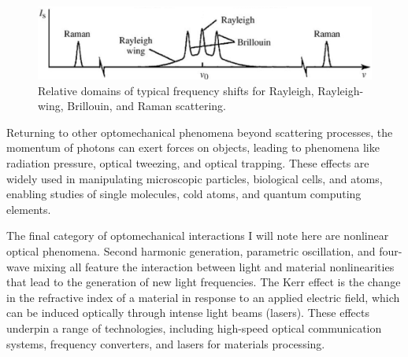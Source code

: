 
\begin{figure}[t] %
\centering
\includegraphics[width=0.75\linewidth]{figs/1-Intro/Boyd scattering frequency shift domains.png}
\caption{Relative domains of typical frequency shifts for Rayleigh, Rayleigh-wing, Brillouin, and Raman scattering.}
\label{fig:scattering-freq-shift-domains}
\end{figure}

Returning to other optomechanical phenomena beyond scattering processes, the momentum of photons can exert forces on objects, leading to phenomena like radiation pressure, optical tweezing, and optical trapping. These effects are widely used in manipulating microscopic particles\cite{}, biological cells\cite{}, and atoms\cite{}, enabling studies of single molecules\cite{}, cold atoms\cite{}, and quantum computing elements\cite{}.

The final category of optomechanical interactions I will note here are nonlinear optical phenomena. Second harmonic generation, parametric oscillation, and four-wave mixing all feature the interaction between light and material nonlinearities that lead to the generation of new light frequencies. The Kerr effect is the change in the refractive index of a material in response to an applied electric field, which can be induced optically through intense light beams (lasers). These effects underpin a range of technologies, including high-speed optical communication systems\cite{}, frequency converters\cite{}, and lasers for materials processing\cite{}.

